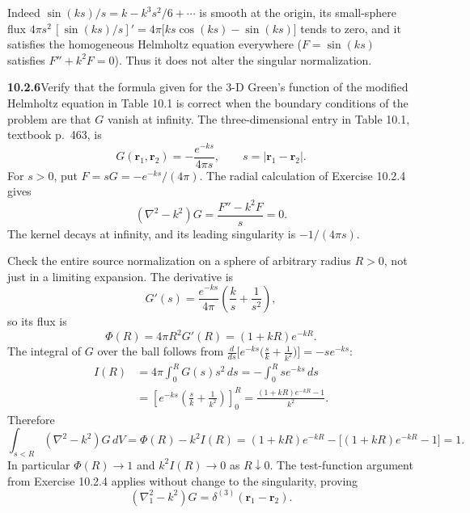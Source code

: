 Indeed $\sin(ks)/s=k-k^3s^2/6+\cdots$ is smooth at the origin,
its small-sphere flux
$4\pi s^2\,[\sin(ks)/s]'=4\pi\bigl[ks\cos(ks)-\sin(ks)\bigr]$
tends to zero, and it satisfies the homogeneous Helmholtz equation
everywhere ($F=\sin(ks)$ satisfies $F''+k^2F=0$). Thus it does not
alter the singular normalization.

\par\bigskip
\noindent\textbf{10.2.6}\quad Verify that the formula given for the 3-D
Green's function of the modified Helmholtz equation in Table 10.1 is correct
when the boundary conditions of the problem are that $G$ vanish at infinity.
\solution
The three-dimensional entry in Table 10.1, textbook p.~463, is
\[
\boxed{G(\mathbf r_1,\mathbf r_2)=-\frac{e^{-ks}}{4\pi s},
\qquad s=|\mathbf r_1-\mathbf r_2|.}
\]
For $s>0$, put $F=sG=-e^{-ks}/(4\pi)$. The radial calculation of
Exercise 10.2.4 gives
\[
(\nabla^2-k^2)G=\frac{F''-k^2F}{s}=0.
\]
The kernel decays at infinity, and its leading singularity is
$-1/(4\pi s)$.

Check the entire source normalization on a sphere of arbitrary radius
$R>0$, not just in a limiting expansion. The derivative is
\[
G'(s)=\frac{e^{-ks}}{4\pi}\left(\frac{k}s+\frac1{s^2}\right),
\]
so its flux is
\[
\Phi(R)=4\pi R^2G'(R)=(1+kR)e^{-kR}.
\]
The integral of $G$ over the ball follows from
$\frac{d}{ds}\bigl[e^{-ks}\bigl(\frac sk+\frac1{k^2}\bigr)\bigr]
=-se^{-ks}$:
\begin{align*}
I(R)&=4\pi\int_0^R G(s)s^2\,ds=-\int_0^R s e^{-ks}\,ds\\
&=\left[e^{-ks}\left(\frac s{k}+\frac1{k^2}\right)\right]_0^R
=\frac{(1+kR)e^{-kR}-1}{k^2}.
\end{align*}
Therefore
\[
\int_{s<R}(\nabla^2-k^2)G\,dV
=\Phi(R)-k^2I(R)
=(1+kR)e^{-kR}-\bigl[(1+kR)e^{-kR}-1\bigr]=1.
\]
In particular $\Phi(R)\to1$ and $k^2I(R)\to0$ as $R\downarrow0$.
The test-function argument from Exercise 10.2.4 applies without change
to the singularity, proving
\[
(\nabla_1^2-k^2)G=\delta^{(3)}(\mathbf r_1-\mathbf r_2).
\]

